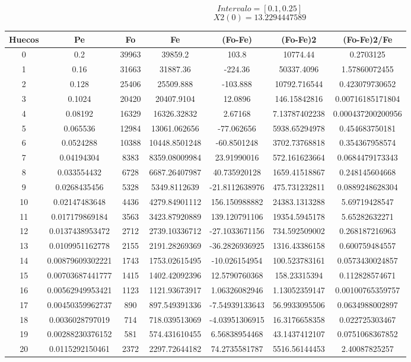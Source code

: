 \documentclass{article}
\begin{document}
$$
Intervalo = [0.1, 0.25]
$$
$$
X2(0) = 13.2294447589
$$
\begin{tabular}{|c|c|c|c|c|c|c|}
Huecos&Pe&Fo&Fe&(Fo{-}Fe)&(Fo{-}Fe)2&(Fo{-}Fe)2/Fe\\
\hline
0&0.2&39963&39859.2&103.8&10774.44&0.2703125\\
\hline
1&0.16&31663&31887.36&{-}224.36&50337.4096&1.57860072455\\
\hline
2&0.128&25406&25509.888&{-}103.888&10792.716544&0.423079730652\\
\hline
3&0.1024&20420&20407.9104&12.0896&146.15842816&0.00716185171804\\
\hline
4&0.08192&16329&16326.32832&2.67168&7.13787402238&0.000437200200956\\
\hline
5&0.065536&12984&13061.062656&{-}77.062656&5938.65294978&0.454683750181\\
\hline
6&0.0524288&10388&10448.8501248&{-}60.8501248&3702.73768818&0.354367958574\\
\hline
7&0.04194304&8383&8359.08009984&23.91990016&572.161623664&0.0684479173343\\
\hline
8&0.033554432&6728&6687.26407987&40.735920128&1659.41518867&0.248145604668\\
\hline
9&0.0268435456&5328&5349.8112639&{-}21.8112638976&475.731232811&0.0889248628304\\
\hline
10&0.02147483648&4436&4279.84901112&156.150988882&24383.1313288&5.69719428547\\
\hline
11&0.017179869184&3563&3423.87920889&139.120791106&19354.5945178&5.65282632271\\
\hline
12&0.0137438953472&2712&2739.10336712&{-}27.1033671156&734.592509002&0.268187216963\\
\hline
13&0.0109951162778&2155&2191.28269369&{-}36.2826936925&1316.43386158&0.600759484557\\
\hline
14&0.00879609302221&1743&1753.02615495&{-}10.026154954&100.523783161&0.0573430024857\\
\hline
15&0.00703687441777&1415&1402.42092396&12.5790760368&158.23315394&0.112828574671\\
\hline
16&0.00562949953421&1123&1121.93673917&1.06326082946&1.13052359147&0.00100765359757\\
\hline
17&0.00450359962737&890&897.549391336&{-}7.54939133643&56.9933095506&0.0634988002897\\
\hline
18&0.0036028797019&714&718.039513069&{-}4.03951306915&16.3176658358&0.022725303467\\
\hline
19&0.00288230376152&581&574.431610455&6.56838954468&43.1437412107&0.0751068367852\\
\hline
20&0.0115292150461&2372&2297.72644182&74.2735581787&5516.56144453&2.40087825257\\
\end{tabular}
\end{document}
